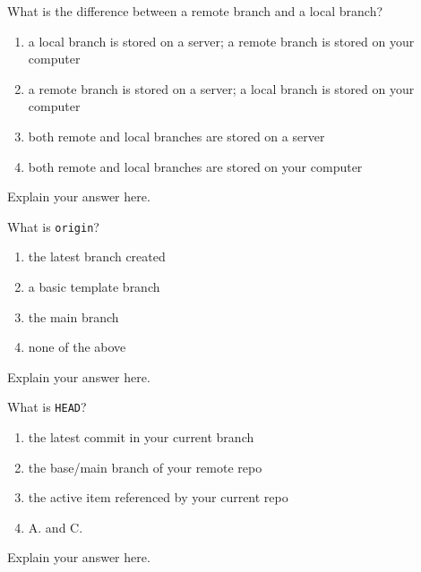 \documentclass[12pt,fleqn]{examtst}
\begin{document}

\newpage
\noindent
\begin{minipage}{\textwidth}

What is the difference between a remote branch and a local branch?

\begin{enumerate}
    \item a local branch is stored on a server; a remote branch is stored on your computer
    \item a remote branch is stored on a server; a local branch is stored on your computer \marker
    \item both remote and local branches are stored on a server
    \item both remote and local branches are stored on your computer
\end{enumerate}
Explain your answer here.

What is \lstinline{origin}?

\begin{enumerate}
    \item the latest branch created
    \item a basic template branch
    \item the main branch \marker
    \item none of the above
\end{enumerate}
Explain your answer here.

What is \lstinline{HEAD}?

\begin{enumerate}
    \item the latest commit in your current branch
    \item the base/main branch of your remote repo
    \item the active item referenced by your current repo
    \item A. and C. \marker
\end{enumerate}
Explain your answer here.

\end{minipage}
\end{document}
